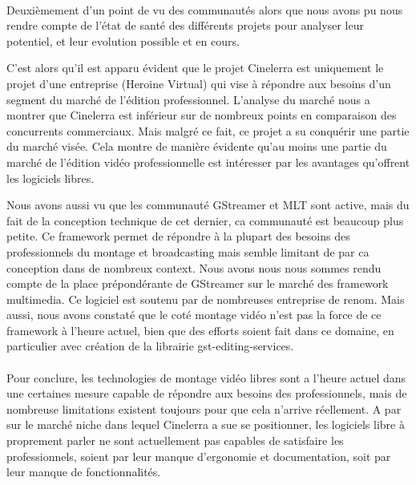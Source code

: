 \paragraph{}

Deuxièmement d'un point de vu des communautés alors que nous avons
pu nous rendre compte de l'état de santé des différents projets pour
analyser leur potentiel, et leur evolution possible et en cours.

C'est alors qu'il est apparu évident que le projet Cinelerra est
uniquement le projet d'une entreprise (Heroine Virtual) qui vise
à répondre aux besoins d'un segment du marché de l'édition
professionnel. L'analyse du marché nous a montrer que Cinelerra
est inférieur sur de nombreux points en comparaison des concurrents
commerciaux.  Mais malgré ce fait, ce projet a su conquérir une partie
du marché visée. Cela montre de manière évidente qu'au moins une
partie du marché de l'édition vidéo professionnelle est intéresser
par les avantages qu'offrent les logiciels libres.

Nous avons aussi vu que les communauté GStreamer et MLT sont active,
mais du fait de la conception technique de cet dernier, ca communauté
est beaucoup plus petite. Ce framework permet de répondre à la plupart
des besoins des professionnels du montage et broadcasting mais semble
limitant de par ca conception dans de nombreux context.  Nous avons
nous nous sommes rendu compte de la place prépondérante de GStreamer
sur le marché des framework multimedia. Ce logiciel est soutenu par de
nombreuses entreprise de renom. Mais aussi, nous avons constaté que
le coté montage vidéo n'est pas la force de ce framework à l'heure
actuel, bien que des efforts soient fait dans ce domaine, en particulier
avec création de la librairie gst-editing-services.

\paragraph{}

Pour conclure, les technologies de montage vidéo libres sont a l'heure
actuel dans une certaines mesure capable de répondre aux besoins des
professionnels, mais de nombreuse limitations existent toujours pour
que cela n'arrive réellement. A par sur le marché niche dans lequel
Cinelerra a sue se positionner, les logiciels libre à proprement parler
ne sont actuellement pas capables de satisfaire les professionnels,
soient par leur manque d'ergonomie et documentation, soit par leur manque
de fonctionnalités.

